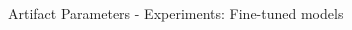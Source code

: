 \documentclass[en,16:9,smallfoot]{sdqbeamer}
\begin{document}
\begin{frame}{Artifact Parameters - Experiments: Fine-tuned models}
\begin{columns}
\begin{overlayarea}{\textwidth}{7cm}
        \end{overlayarea}
   \end{columns}
   \end{frame}
\end{document}
